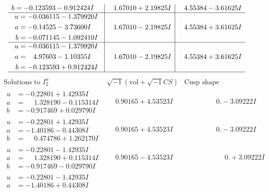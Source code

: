 \documentclass[1p]{elsarticle_modified}
\theoremstyle{definition}
\newcommand{\I}{\sqrt{-1}}
\begin{document}
$$\begin{array}{c|c|c}
\begin{aligned}
b &= -0.123593 - 0.912424 I\end{aligned}
 & \phantom{-}1.67010 + 2.19825 I & \phantom{-}4.55384 - 3.61625 I \\ \hline\begin{aligned}
u &= -0.036115 - 1.379920 I \\
a &= -0.14525 - 3.73600 I \\
b &= -0.071145 - 1.092410 I\end{aligned}
 & \phantom{-}1.67010 - 2.19825 I & \phantom{-}4.55384 + 3.61625 I \\ \hline\begin{aligned}
u &= -0.036115 - 1.379920 I \\
a &= \phantom{-}4.97603 - 1.10355 I \\
b &= -0.123593 + 0.912424 I\end{aligned}
 & \phantom{-}1.67010 - 2.19825 I & \phantom{-}4.55384 + 3.61625 I\\
 \hline 
 \end{array}$$\newpage$$\begin{array}{c|c|c}  
\text{Solutions to }I^u_{2}& \I (\text{vol} + \sqrt{-1}CS) & \text{Cusp shape}\\
 \hline 
\begin{aligned}
u &= -0.22801 + 1.42935 I \\
a &= \phantom{-}1.328190 - 0.115314 I \\
b &= -0.917469 + 0.029790 I\end{aligned}
 & \phantom{-}0.90165 + 4.53523 I & \phantom{-0.000000 } 0. - 3.09222 I \\ \hline\begin{aligned}
u &= -0.22801 + 1.42935 I \\
a &= -1.40186 - 0.44308 I \\
b &= \phantom{-}0.474786 + 1.262170 I\end{aligned}
 & \phantom{-}0.90165 + 4.53523 I & \phantom{-0.000000 } 0. - 3.09222 I \\ \hline\begin{aligned}
u &= -0.22801 - 1.42935 I \\
a &= \phantom{-}1.328190 + 0.115314 I \\
b &= -0.917469 - 0.029790 I\end{aligned}
 & \phantom{-}0.90165 - 4.53523 I & \phantom{-0.000000 -}0. + 3.09222 I \\ \hline\begin{aligned}
u &= -0.22801 - 1.42935 I \\
a &= -1.40186 + 0.44308 I \\

\end{aligned}
\end{array}$$
\end{document}
